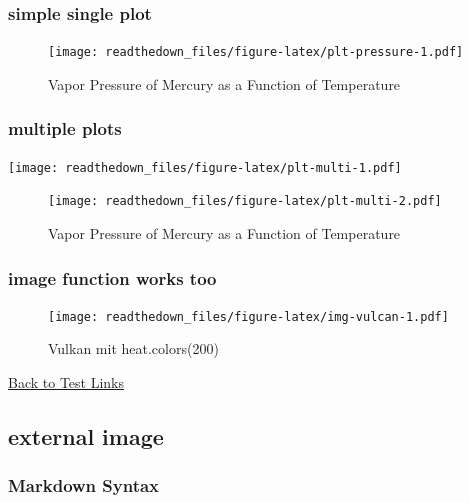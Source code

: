 \documentclass[
]{article}
\begin{document}
\hypertarget{simple-single-plot}{%
\subsubsection{simple single plot}\label{simple-single-plot}}

\begin{figure}
\hypertarget{fig:plt-pressure}{%
\centering
\texttt{[image: readthedown\_files/figure-latex/plt-pressure-1.pdf]}
\caption{Vapor Pressure of Mercury as a Function of
Temperature}\label{fig:plt-pressure}
}
\end{figure}

\hypertarget{multiple-plots}{%
\subsubsection{multiple plots}\label{multiple-plots}}

\texttt{[image: readthedown\_files/figure-latex/plt-multi-1.pdf]}

\begin{figure}
\hypertarget{fig:plt-multi}{%
\centering
\texttt{[image: readthedown\_files/figure-latex/plt-multi-2.pdf]}
\caption{Vapor Pressure of Mercury as a Function of
Temperature}\label{fig:plt-multi}
}
\end{figure}

\hypertarget{image-function-works-too}{%
\subsubsection{image function works
too}\label{image-function-works-too}}

\begin{figure}
\hypertarget{fig:img-vulcan}{%
\centering
\texttt{[image: readthedown\_files/figure-latex/img-vulcan-1.pdf]}
\caption{Vulkan mit heat.colors(200)}\label{fig:img-vulcan}
}
\end{figure}

\protect\hyperlink{sec:test}{Back to Test Links}

\hypertarget{external-image}{%
\subsection{external image}\label{external-image}}

\hypertarget{markdown-syntax}{%
\subsubsection{Markdown Syntax}\label{markdown-syntax}}
\end{document}
